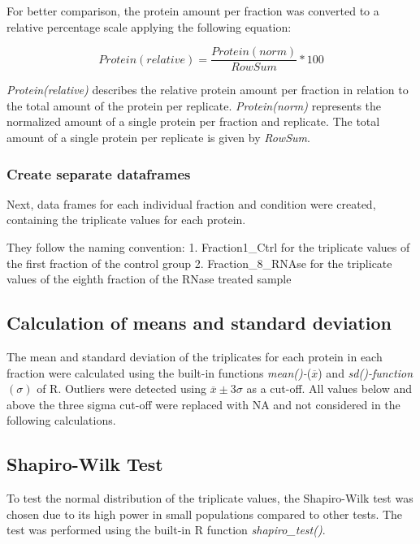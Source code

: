 \documentclass[
]{article}
\begin{document}
For better comparison, the protein amount per fraction was converted to
a relative percentage scale applying the following equation:

\[Protein(relative) = \frac{Protein(norm)}{RowSum}*100\]

\emph{Protein(relative)} describes the relative protein amount per
fraction in relation to the total amount of the protein per replicate.
\emph{Protein(norm)} represents the normalized amount of a single
protein per fraction and replicate. The total amount of a single protein
per replicate is given by \emph{RowSum}.

\hypertarget{create-separate-dataframes}{%
\subsubsection{Create separate
dataframes}\label{create-separate-dataframes}}

Next, data frames for each individual fraction and condition were
created, containing the triplicate values for each protein.

They follow the naming convention: 1. Fraction1\_Ctrl for the triplicate
values of the first fraction of the control group 2. Fraction\_8\_RNAse
for the triplicate values of the eighth fraction of the RNase treated
sample

\hypertarget{calculation-of-means-and-standard-deviation}{%
\subsection{Calculation of means and standard
deviation}\label{calculation-of-means-and-standard-deviation}}

The mean and standard deviation of the triplicates for each protein in
each fraction were calculated using the built-in functions
\emph{mean()-}(\(\overline x\)) and \emph{sd()-function}\((\sigma)\) of
R. Outliers were detected using \(\overline x \pm 3\sigma\) as a
cut-off. All values below and above the three sigma cut-off were
replaced with NA and not considered in the following calculations.

\hypertarget{shapiro-wilk-test}{%
\subsection{Shapiro-Wilk Test}\label{shapiro-wilk-test}}

To test the normal distribution of the triplicate values, the
Shapiro-Wilk test was chosen due to its high power in small populations
compared to other tests. The test was performed using the built-in R
function \emph{shapiro\_test()}.
\end{document}
